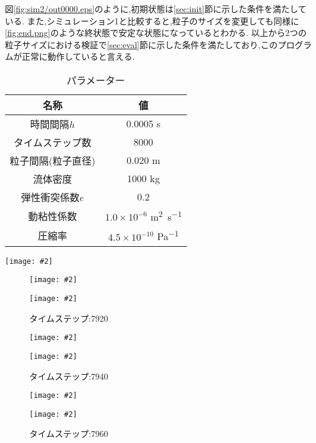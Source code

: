 \documentclass[uplatex,a4j,11pt]{jsarticle}
\makeatletter
\def\fgcaption{\def\@captype{figure}\caption}
\newcommand{\mfig}[3][width=15cm]{
\begin{center}
    \texttt{[image: \#2]}
\fgcaption{#3 \label{fig:#2}}
\end{center}
}
\makeatother
\begin{document}
図\ref{fig:sim2/out0000.eps}のように,初期状態は\ref{sec:init}節に示した条件を満たしている.
また,シミュレーション1と比較すると,粒子のサイズを変更しても同様に\ref{fig:end.png}のような終状態で安定な状態になっているとわかる.
以上から2つの粒子サイズにおける検証で\ref{sec:eval}節に示した条件を満たしており,このプログラムが正常に動作していると言える.
\begin{table}[h]
   \caption{パラメーター}
   \label{tab:sim2}
   \centering
   \begin{tabular}{cc}
     \hline
     名称&値\\
     \hline \hline
     時間間隔$h$&0.0005 \si{\second}\\
     タイムステップ数&8000\\
     粒子間隔(粒子直径)&0.020 \si{\metre}\\
     流体密度&1000 \si{\kilo\gram}\\
     弾性衝突係数$e$&0.2\\
     動粘性係数&$1.0\times10^{-6}$ \si{\metre^{2}.\second^{-1}}\\
     圧縮率&$4.5\times10^{-10}$ \si{\pascal^{-1}}\\
     \hline
   \end{tabular}
\end{table}
\mfig[width=10cm]{sim2/out0000.eps}{初期状態}
\begin{figure}[htbp]
    \begin{minipage}{0.5\hsize}
        \mfig[width=7cm]{sim2/out0791.eps}{タイムステップ:7910}
    \end{minipage}
    \begin{minipage}{0.5\hsize}
        \mfig[width=7cm]{sim2/out0792.eps}{タイムステップ:7920}
    \end{minipage} 
\end{figure}
\begin{figure}[htbp]
    \begin{minipage}{0.5\hsize}
        \mfig[width=7cm]{sim2/out0793.eps}{タイムステップ:7930}
    \end{minipage}
    \begin{minipage}{0.5\hsize}
        \mfig[width=7cm]{sim2/out0794.eps}{タイムステップ:7940}
    \end{minipage} 
\end{figure}
\begin{figure}[htbp]
    \begin{minipage}{0.5\hsize}
        \mfig[width=7cm]{sim2/out0795.eps}{タイムステップ:7950}
    \end{minipage}
    \begin{minipage}{0.5\hsize}
        \mfig[width=7cm]{sim2/out0796.eps}{タイムステップ:7960}
    \end{minipage} 
\end{figure}
\end{document}

